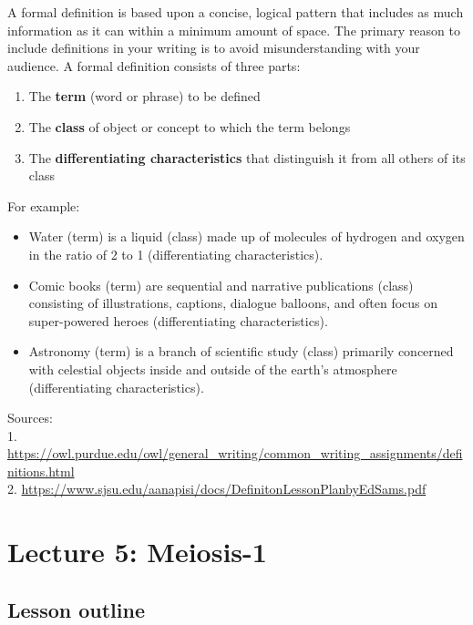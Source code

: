 \documentclass[
]{book}
\providecommand{\tightlist}{%
  \setlength{\itemsep}{0pt}\setlength{\parskip}{0pt}}
\begin{document}
A formal definition is based upon a concise, logical pattern that includes as much information as it can within a minimum amount of space. The primary reason to include definitions in your writing is to avoid misunderstanding with your audience. A formal definition consists of three parts:

\begin{enumerate}
\def\labelenumi{\arabic{enumi}.}
\tightlist
\item
  The \textbf{term} (word or phrase) to be defined\\
\item
  The \textbf{class} of object or concept to which the term belongs\\
\item
  The \textbf{differentiating characteristics} that distinguish it from all others of its class
\end{enumerate}

For example:

\begin{itemize}
\tightlist
\item
  Water (term) is a liquid (class) made up of molecules of hydrogen and oxygen in the ratio of 2 to 1 (differentiating characteristics).\\
\item
  Comic books (term) are sequential and narrative publications (class) consisting of illustrations, captions, dialogue balloons, and often focus on super-powered heroes (differentiating characteristics).\\
\item
  Astronomy (term) is a branch of scientific study (class) primarily concerned with celestial objects inside and outside of the earth's atmosphere (differentiating characteristics).
\end{itemize}

Sources:\\
1. \url{https://owl.purdue.edu/owl/general_writing/common_writing_assignments/definitions.html}\\
2. \url{https://www.sjsu.edu/aanapisi/docs/DefinitonLessonPlanbyEdSams.pdf}

\hypertarget{lecture-5-meiosis-1}{%
\section{Lecture 5: Meiosis-1}\label{lecture-5-meiosis-1}}

\hypertarget{lesson-outline-1}{%
\subsection{Lesson outline}\label{lesson-outline-1}}
\end{document}
